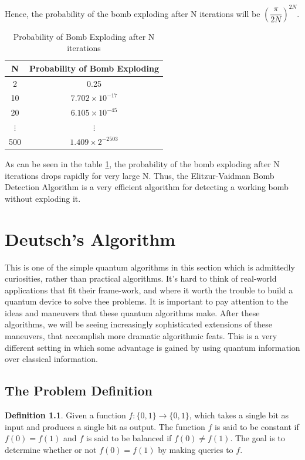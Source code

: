\documentclass[12pt, oneside]{book}
\theoremstyle{definition}
\newtheorem{definition}{Definition}[section]
\theoremstyle{definition}
\theoremstyle{remark}
\begin{document}
    Hence, the probability of the bomb exploding after N iterations will be $\left(\dfrac{\pi}{2N}\right)^{2N}$.
    \begin{table}[H]
        \centering
        \begin{tabular}{|c|c|}
            \hline
            N & Probability of Bomb Exploding \\
            \hline
            2 & 0.25 \\
            10 & $7.702 \times 10^{-17}$  \\
            20 & $6.105 \times 10^{-45}$ \\
            $\vdots$ & $\vdots$ \\
            500 & $1.409 \times 2^{-2503}$ \\
            \hline
        \end{tabular}
        \caption{Probability of Bomb Exploding after N iterations}
        \label{tab:Prob}
    \end{table}
    As can be seen in the table \ref{tab:Prob}, the probability of the bomb exploding after N iterations drops rapidly for very large N. Thus, the Elitzur-Vaidman Bomb Detection Algorithm is a very efficient algorithm for detecting a working bomb without exploding it.

\chapter{Deutsch's Algorithm}
This is one of the simple quantum algorithms in this section which is admittedly curiosities, rather than practical algorithms. It's hard to think of real-world applications that fit their frame-work, and where it worth the trouble to build a quantum device to solve thee problems. It is important to pay attention to the ideas and maneuvers that these quantum algorithms make. After these algorithms, we will be seeing increasingly sophisticated extensions of these maneuvers, that accomplish more dramatic algorithmic feats. This is a very different setting in which some advantage is gained by using quantum information over classical information.
\section{The Problem Definition}
\begin{definition}
    Given a function $f:\{0,1\}\rightarrow\{0,1\}$, which takes a single bit as input and 
    produces a single bit as output. The function $f$ is said to be constant if $f(0)=f(1)$ and $f$ is said to be balanced if $f(0)\neq f(1)$. The goal is to determine whether or not $f(0)=f(1)$ by making queries to $f$.
\end{definition}
\end{document}
